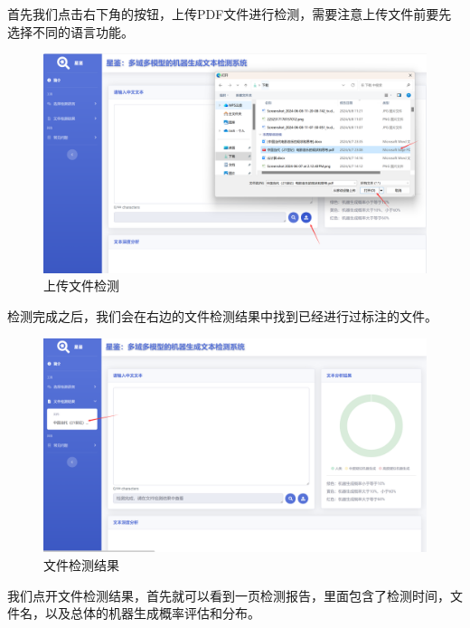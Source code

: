 \documentclass[a4paper]{report}
\begin{document}
首先我们点击右下角的按钮，上传PDF文件进行检测，需要注意上传文件前要先选择不同的语言功能。
\begin{figure}[H]
	\centering
	\includegraphics[width=\textwidth]{figures/上传文件检测.png}
	\caption{上传文件检测}
	\label{上传文件检测}
\end{figure}
检测完成之后，我们会在右边的文件检测结果中找到已经进行过标注的文件。
\begin{figure}[H]
	\centering
	\includegraphics[width=\textwidth]{figures/文件检测结果.png}
	\caption{文件检测结果}
	\label{文件检测结果}
\end{figure}
我们点开文件检测结果，首先就可以看到一页检测报告，里面包含了检测时间，文件名，以及总体的机器生成概率评估和分布。
\end{document}
